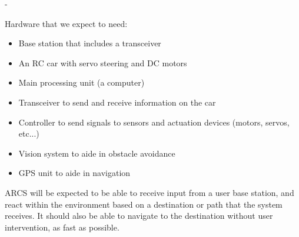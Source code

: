 -\documentclass[compsoc,draftclsnofoot,onecolumn,10pt]{IEEEtran}
\begin{document}
Hardware that we expect to need:
\begin{itemize} 
\item Base station that includes a transceiver
\item An RC car with servo steering and DC motors
\item Main processing unit (a computer)
\item Transceiver to send and receive information on the car
\item Controller to send signals to sensors and actuation devices (motors, servos, etc...) 
\item Vision system to aide in obstacle avoidance
\item GPS unit to aide in navigation
\end{itemize}

ARCS will be expected to be able to receive input from a user base station, and react
within the environment based on a destination or path that the system receives. It should also
be able to navigate to the destination without user intervention, as fast as possible. \par
\end{document}
